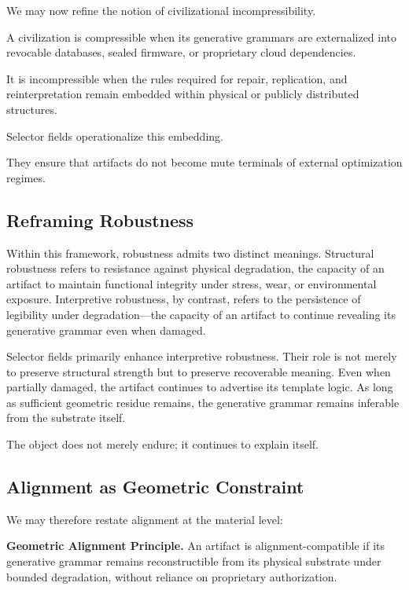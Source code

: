 \documentclass[11pt]{article}
\begin{document}
We may now refine the notion of civilizational incompressibility.

A civilization is compressible when its generative grammars are 
externalized into revocable databases, sealed firmware, or proprietary 
cloud dependencies.

It is incompressible when the rules required for repair, replication, 
and reinterpretation remain embedded within physical or publicly 
distributed structures.

Selector fields operationalize this embedding.

They ensure that artifacts do not become mute terminals of external 
optimization regimes.

\subsection{Reframing Robustness}

Within this framework, robustness admits two distinct meanings.
Structural robustness refers to resistance against physical degradation,
the capacity of an artifact to maintain functional integrity under
stress, wear, or environmental exposure. Interpretive robustness, by
contrast, refers to the persistence of legibility under degradation---the
capacity of an artifact to continue revealing its generative grammar even
when damaged.

Selector fields primarily enhance interpretive robustness. Their role is
not merely to preserve structural strength but to preserve recoverable
meaning. Even when partially damaged, the artifact continues to advertise
its template logic. As long as sufficient geometric residue remains, the
generative grammar remains inferable from the substrate itself.

The object does not merely endure; it continues to explain itself.

\subsection{Alignment as Geometric Constraint}

We may therefore restate alignment at the material level:

\medskip

\noindent
\textbf{Geometric Alignment Principle.}
An artifact is alignment-compatible if its generative grammar remains 
reconstructible from its physical substrate under bounded degradation, 
without reliance on proprietary authorization.
\end{document}
